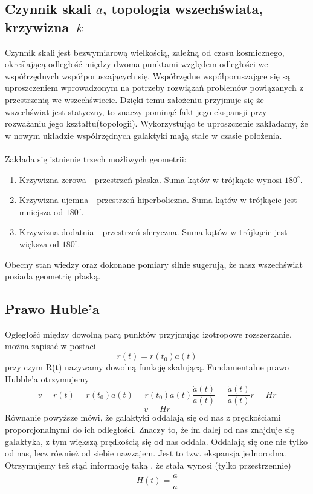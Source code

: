 \documentclass[12pt]{article}
\begin{document}
	\subsection{Czynnik skali $a$, topologia wszechświata, krzywizna~$k$}
	Czynnik skali jest bezwymiarową wielkością, zależną od czasu kosmicznego\cite{Cosmology}, określającą odległość między dwoma punktami względem odległości we współrzędnych współporuszających się. 
	Współrzędne współporuszające się są uproszczeniem wprowadzonym na potrzeby rozwiązań problemów powiązanych z przestrzenią we wszechświecie. Dzięki temu założeniu przyjmuje się że wszechświat jest statyczny, to znaczy pominąć fakt jego ekspansji przy rozważaniu jego kształtu(topologii). Wykorzystując te uproszczenie zakładamy, że w nowym układzie współrzędnych galaktyki mają stałe w czasie położenia. \\\\
	Zakłada się istnienie trzech możliwych geometrii:
	\begin{enumerate}
		\item Krzywizna zerowa - przestrzeń płaska. Suma kątów w trójkącie wynosi $180^\circ$.
		\item Krzywizna ujemna - przestrzeń hiperboliczna. Suma kątów w trójkącie jest mniejsza od $180^\circ$.
		\item Krzywizna dodatnia - przestrzeń sferyczna. Suma kątów w trójkącie jest większa od $180^\circ$. 
	\end{enumerate}
	Obecny stan wiedzy oraz dokonane pomiary silnie sugerują, że nasz wszechświat posiada geometrię płaską.\cite{Curvature} 
	
	\subsection{Prawo Huble'a}
	Ogległość między dowolną parą punktów przyjmując izotropowe rozszerzanie, można zapisać w postaci
	\begin{equation}
	r(t)=r(t_{0})a(t)
	\end{equation}
	przy czym  R(t) nazywamy dowolną funkcję skalującą.
	Fundamentalne prawo Hubble'a otrzymujemy 
	\begin{equation}
	v=\dot{r}(t)=r(t_{0})\dot{a}(t)=r(t_{0})a(t) \frac{\dot{a}(t)}{a(t)}=\frac{\dot{a}(t)}{a(t)}r= Hr
	\end{equation}
	\begin{equation}
	v=Hr
	\end{equation}
	Równanie powyższe mówi, że galaktyki oddalają się od nas z prędkościami proporcjonalnymi do ich odległości. Znaczy to, że im dalej od nas znajduje się galaktyka, z tym większą prędkością się od nas oddala. Oddalają się one nie tylko od nas, lecz również od siebie nawzajem. Jest to tzw. ekspansja jednorodna. 
	Otrzymujemy też stąd informację taką , że stała wynosi (tylko przestrzennie)
	\begin{equation}
	H(t)=\frac{\dot{a}}{a}
	\end{equation}
\end{document}
